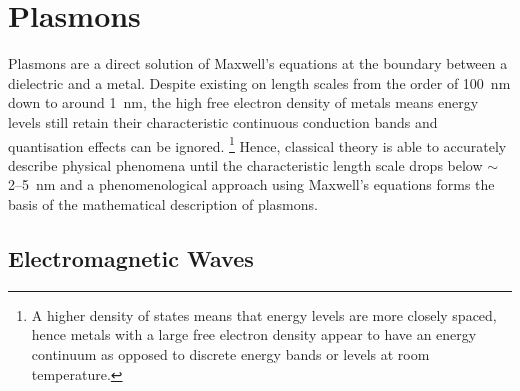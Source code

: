 \documentclass{article}
\begin{document}
\section{Plasmons}
\label{sec:plasmons}

Plasmons are a direct solution of Maxwell's equations at the boundary between a dielectric and a metal. Despite existing on length scales from the order of \SI{100}{nm} down to around \SI{1}{nm}, the high free electron density of metals means energy levels still retain their characteristic continuous conduction bands and quantisation effects can be ignored.%
\footnote{A higher density of states means that energy levels are more closely spaced, hence metals with a large free electron density appear to have an energy continuum as opposed to discrete energy bands or levels at room temperature.}
Hence, classical theory is able to accurately describe physical phenomena until the characteristic length scale drops below $\sim$2--\SI{5}{nm} and a phenomenological approach using Maxwell's equations forms the basis of the mathematical description of plasmons.

\subsection{Electromagnetic Waves}
\label{sec:em_waves}
\end{document}
